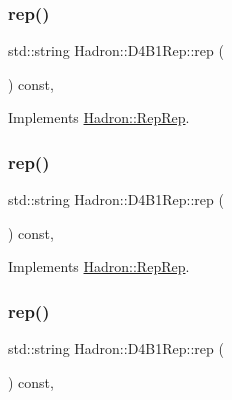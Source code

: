 \subsubsection{\texorpdfstring{rep()}{rep()}\hspace{0.1cm}{\footnotesize\ttfamily [3/5]}}
{\footnotesize\ttfamily std\+::string Hadron\+::\+D4\+B1\+Rep\+::rep (\begin{DoxyParamCaption}{ }\end{DoxyParamCaption}) const\hspace{0.3cm}{\ttfamily [inline]}, {\ttfamily [virtual]}}



Implements \mbox{\hyperlink{structHadron_1_1RepRep_ab3213025f6de249f7095892109575fde}{Hadron\+::\+Rep\+Rep}}.

\mbox{\label{structHadron_1_1D4B1Rep_a516f90b12897aaf51c240310d9183687}} 
\subsubsection{\texorpdfstring{rep()}{rep()}\hspace{0.1cm}{\footnotesize\ttfamily [4/5]}}
{\footnotesize\ttfamily std\+::string Hadron\+::\+D4\+B1\+Rep\+::rep (\begin{DoxyParamCaption}{ }\end{DoxyParamCaption}) const\hspace{0.3cm}{\ttfamily [inline]}, {\ttfamily [virtual]}}



Implements \mbox{\hyperlink{structHadron_1_1RepRep_ab3213025f6de249f7095892109575fde}{Hadron\+::\+Rep\+Rep}}.

\mbox{\label{structHadron_1_1D4B1Rep_a516f90b12897aaf51c240310d9183687}} 
\subsubsection{\texorpdfstring{rep()}{rep()}\hspace{0.1cm}{\footnotesize\ttfamily [5/5]}}
{\footnotesize\ttfamily std\+::string Hadron\+::\+D4\+B1\+Rep\+::rep (\begin{DoxyParamCaption}{ }\end{DoxyParamCaption}) const\hspace{0.3cm}{\ttfamily [inline]}, {\ttfamily [virtual]}}



